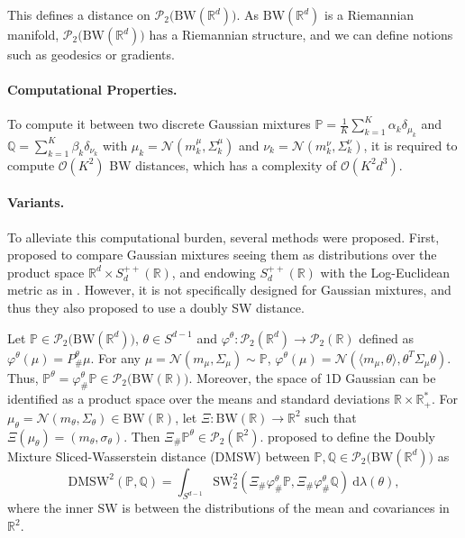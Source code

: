 \documentclass[twoside]{article}
\newcommand{\cP}{\mathcal{P}}
\newcommand{\bP}{\mathbb{P}}
\newcommand{\bQ}{\mathbb{Q}}
\newcommand{\cN}{\mathcal{N}}
\newcommand{\cO}{\mathcal{O}}
\newcommand{\cPBW}{\mathcal{P}_2\big(\bw(\R^d)\big)}
\newcommand{\R}{\mathbb{R}}
\newcommand{\bw}{\mathrm{BW}}
\newcommand{\sw}{\mathrm{SW}}
\begin{document}
This defines a distance on $\cPBW$. As $\bw(\R^d)$ is a Riemannian manifold, $\cPBW$ has a Riemannian structure, and we can define notions such as geodesics or gradients.








\paragraph{Computational Properties.}

To compute it between two discrete Gaussian mixtures $\bP=\frac1K\sum_{k=1}^K \alpha_k\delta_{\mu_k}$ and $\bQ=\sum_{k=1}^K \beta_k\delta_{\nu_k}$ with $\mu_k=\cN(m^\mu_k,\Sigma^\mu_k)$ and $\nu_k=\cN(m^\nu_k,\Sigma^\nu_k)$, it is required to compute $\cO(K^2)$ BW distances, which has a complexity of $\cO(K^2 d^3)$.


\paragraph{Variants.}

To alleviate this computational burden, several methods were proposed. First, \citet{nguyen2024summarizing} proposed to compare Gaussian mixtures seeing them as distributions over the product space $\R^d\times S_d^{++}(\R)$, and endowing $S_d^{++}(\R)$ with the Log-Euclidean metric as in \citep{bonet2023sliced,bonet2025sliced}. However, it is not specifically designed for Gaussian mixtures, and thus they also proposed to use a doubly SW distance.

Let $\bP\in\cPBW$, $\theta\in S^{d-1}$ and $\varphi^\theta:\cP_2(\R^d)\to\cP_2(\R)$ defined as $\varphi^\theta(\mu)=P^\theta_\#\mu$. For any $\mu=\cN(m_\mu,\Sigma_\mu)\sim\bP$, $\varphi^\theta(\mu)=\cN(\langle m_\mu,\theta\rangle, \theta^T\Sigma_\mu \theta)$. Thus, $\bP^\theta=\varphi^\theta_\#\bP \in \cP_2\big(\bw(\R)\big)$. Moreover, the space of 1D Gaussian can be identified as a product space over the means and standard deviations $\R\times\R_+^*$. For $\mu_\theta=\cN(m_\theta,\Sigma_\theta)\in\bw(\R)$, let $\Xi:\bw(\R)\to \R^2$ such that $\Xi(\mu_\theta)=(m_\theta, \sigma_\theta)$. Then $\Xi_\#\bP^\theta\in\cP_2(\R^2)$.
\citet{piening2025slicing,nguyen2024summarizing} proposed to define the Doubly Mixture Sliced-Wasserstein distance (DMSW) between $\bP,\bQ\in\cPBW$ as
\begin{equation}
    \mathrm{DMSW}^2(\bP,\bQ) = \int_{S^{d-1}} \sw_2^2\left(\Xi_\#\varphi^\theta_\#\bP,\Xi_\#\varphi^\theta_\#\bQ\right)\ \mathrm{d}\lambda(\theta),
\end{equation}
where the inner SW is between the distributions of the mean and covariances in $\R^2$.
\end{document}
